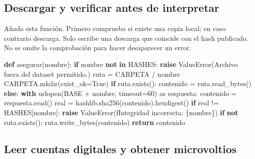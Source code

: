 \documentclass[
  spanish,
  10.5pt,
  a4paper,
  DIV=11,
  numbers=noendperiod]{scrartcl}
\newenvironment{Shaded}{\begin{snugshade}}{\end{snugshade}}
\newcommand{\ControlFlowTok}[1]{\textcolor[rgb]{0.00,0.23,0.31}{\textbf{#1}}}
\newcommand{\DecValTok}[1]{\textcolor[rgb]{0.68,0.00,0.00}{#1}}
\newcommand{\ImportTok}[1]{\textcolor[rgb]{0.00,0.46,0.62}{#1}}
\newcommand{\KeywordTok}[1]{\textcolor[rgb]{0.00,0.23,0.31}{\textbf{#1}}}
\newcommand{\NormalTok}[1]{\textcolor[rgb]{0.00,0.23,0.31}{#1}}
\newcommand{\OperatorTok}[1]{\textcolor[rgb]{0.37,0.37,0.37}{#1}}
\newcommand{\PreprocessorTok}[1]{\textcolor[rgb]{0.68,0.00,0.00}{#1}}
\newcommand{\SpecialCharTok}[1]{\textcolor[rgb]{0.37,0.37,0.37}{#1}}
\newcommand{\SpecialStringTok}[1]{\textcolor[rgb]{0.13,0.47,0.30}{#1}}
\newcommand{\StringTok}[1]{\textcolor[rgb]{0.13,0.47,0.30}{#1}}
\newcommand{\VariableTok}[1]{\textcolor[rgb]{0.07,0.07,0.07}{#1}}
\begin{document}
\subsection{Descargar y verificar antes de
interpretar}\label{descargar-y-verificar-antes-de-interpretar}

Añada esta función. Primero comprueba si existe una copia local; en caso
contrario descarga. Solo escribe una descarga que coincide con el hash
publicado. No se omite la comprobación para hacer desaparecer un error.

\begin{Shaded}
\begin{Highlighting}[]
\KeywordTok{def}\NormalTok{ asegurar(nombre):}
    \ControlFlowTok{if}\NormalTok{ nombre }\KeywordTok{not} \KeywordTok{in}\NormalTok{ HASHES:}
        \ControlFlowTok{raise} \PreprocessorTok{ValueError}\NormalTok{(}\StringTok{\textquotesingle{}Archivo fuera del dataset permitido.\textquotesingle{}}\NormalTok{)}
\NormalTok{    ruta }\OperatorTok{=}\NormalTok{ CARPETA }\OperatorTok{/}\NormalTok{ nombre}
\NormalTok{    CARPETA.mkdir(exist\_ok}\OperatorTok{=}\VariableTok{True}\NormalTok{)}
    \ControlFlowTok{if}\NormalTok{ ruta.exists():}
\NormalTok{        contenido }\OperatorTok{=}\NormalTok{ ruta.read\_bytes()}
    \ControlFlowTok{else}\NormalTok{:}
        \ControlFlowTok{with}\NormalTok{ urlopen(BASE }\OperatorTok{+}\NormalTok{ nombre, timeout}\OperatorTok{=}\DecValTok{60}\NormalTok{) }\ImportTok{as}\NormalTok{ respuesta:}
\NormalTok{            contenido }\OperatorTok{=}\NormalTok{ respuesta.read()}
\NormalTok{    real }\OperatorTok{=}\NormalTok{ hashlib.sha256(contenido).hexdigest()}
    \ControlFlowTok{if}\NormalTok{ real }\OperatorTok{!=}\NormalTok{ HASHES[nombre]:}
        \ControlFlowTok{raise} \PreprocessorTok{ValueError}\NormalTok{(}\SpecialStringTok{f\textquotesingle{}Integridad incorrecta: }\SpecialCharTok{\{}\NormalTok{nombre}\SpecialCharTok{\}}\SpecialStringTok{\textquotesingle{}}\NormalTok{)}
    \ControlFlowTok{if} \KeywordTok{not}\NormalTok{ ruta.exists():}
\NormalTok{        ruta.write\_bytes(contenido)}
    \ControlFlowTok{return}\NormalTok{ contenido}
\end{Highlighting}
\end{Shaded}

\subsection{Leer cuentas digitales y obtener
microvoltios}\label{leer-cuentas-digitales-y-obtener-microvoltios}
\end{document}
